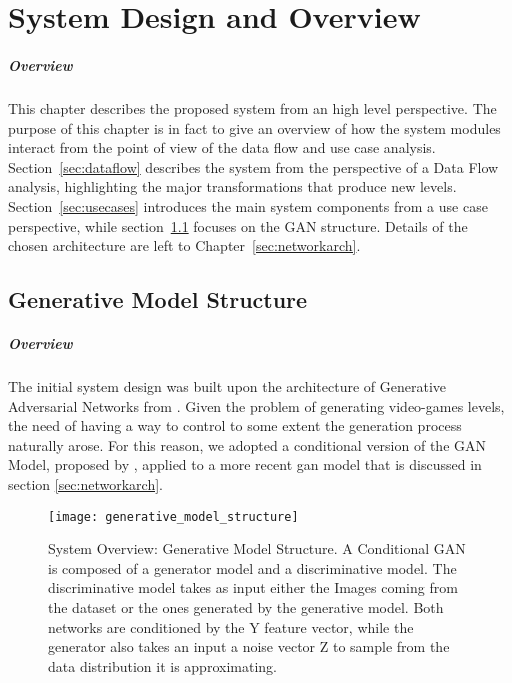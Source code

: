 \chapter{System Design and Overview}
\paragraph{Overview} %
 This chapter describes the proposed system from an high level perspective. The purpose of this chapter is in fact to give an overview of how the system modules interact from the point of view of the data flow and use case analysis. Section~\ref{sec:dataflow} describes the system from the perspective of a Data Flow analysis, highlighting the major transformations that produce new levels. Section~\ref{sec:usecases} introduces the main system components from a use case perspective, while section~\ref{sec:modelstructure} focuses on the GAN structure. Details of the chosen architecture are left to Chapter~\ref{sec:networkarch}.


\section{Generative Model Structure}
\label{sec:modelstructure}
\paragraph{Overview} The initial system design was built upon the architecture of Generative Adversarial Networks \cite{gan} from \citeauthor{gan}. Given the problem of generating video-games levels, the need of having a way to control to some extent the  generation process naturally arose. For this reason, we adopted a conditional version \cite{conditionalgan} of the GAN Model, proposed by \citeauthor{conditionalgan}, applied to a more recent \gls{gan} model that is discussed in section \ref{sec:networkarch}.


\begin{figure}[h!]
	\begin{center}
		\texttt{[image: generative\_model\_structure]}
	\end{center}
	
	\captionsetup{width=\linewidth}
	\caption[System Overview: Generative Model Structure]{ System Overview: Generative Model Structure. A Conditional GAN is composed of a generator model and a discriminative model. The discriminative model takes as input either the Images coming from the dataset or the ones generated by the generative model. Both networks are conditioned by the Y feature vector, while the generator also takes an input a noise vector Z to sample from the data distribution it is approximating. }
	\label{fig:genmodelstructure}
\end{figure}


